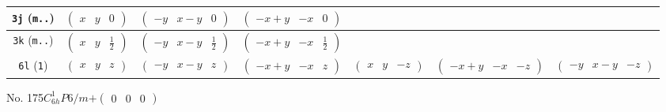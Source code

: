 \documentclass[fleqn,9pt,landscape]{jsarticle}
\begin{document}
\begin{center}
\begin{longtable}{ccccccc}
{\tt 3j} ({\tt m..}) & $ \begin{pmatrix} x & y & 0 \end{pmatrix} $ & $ \begin{pmatrix} - y & x - y & 0 \end{pmatrix} $ & $ \begin{pmatrix} - x + y & - x & 0 \end{pmatrix} $ & $  $ & $  $ & $  $ \\ \hline
{\tt 3k} ({\tt m..}) & $ \begin{pmatrix} x & y & \frac{1}{2} \end{pmatrix} $ & $ \begin{pmatrix} - y & x - y & \frac{1}{2} \end{pmatrix} $ & $ \begin{pmatrix} - x + y & - x & \frac{1}{2} \end{pmatrix} $ & $  $ & $  $ & $  $ \\ \hline
{\tt 6l} ({\tt 1}) & $ \begin{pmatrix} x & y & z \end{pmatrix} $ & $ \begin{pmatrix} - y & x - y & z \end{pmatrix} $ & $ \begin{pmatrix} - x + y & - x & z \end{pmatrix} $ & $ \begin{pmatrix} x & y & - z \end{pmatrix} $ & $ \begin{pmatrix} - x + y & - x & - z \end{pmatrix} $ & $ \begin{pmatrix} - y & x - y & - z \end{pmatrix} $ \\
\end{longtable}
\end{center}
\newpage
No. 175\quad$C_{6h}^{1}$\quad$P6/m$\quad[ hexagonal ]\quad$+\begin{pmatrix} 0 & 0 & 0 \end{pmatrix}$
\end{document}
